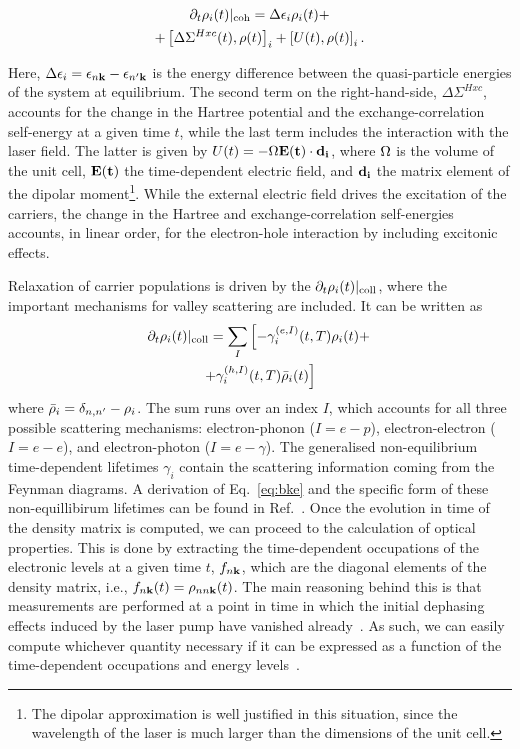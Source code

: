 \documentclass[prb,aps,superscriptaddress,reprint,floatfix]{revtex4-1}
\begin{document}
\begin{multline}
 \partial_t\rho_i(t)|_\text{coh} = \Delta\epsilon_i\rho_i(t) +\\ +\left[\Delta\Sigma^{Hxc}(t),\rho(t)\right]_i + \left[U(t),\rho(t)\right]_i.
\label{eq:coh}   
\end{multline}

Here, $\Delta\epsilon_i = \epsilon_{n{\mathbf k}} - \epsilon_{n' {\mathbf k}}$ is the energy difference between the quasi-particle energies of the system at equilibrium. The second term on the right-hand-side, $\Delta\Sigma^{Hxc}$, accounts for the change in the Hartree potential and the exchange-correlation self-energy at a given time $t$, while the last term includes the interaction with the laser field. The latter is given by $U(t) = -\Omega\bf E(t)\cdot\bf d_i$, where $\Omega$ is the volume of the unit cell, $\bf E(t)$ the time-dependent electric field, and $\bf d_i$ the matrix element of the dipolar moment\footnote{The dipolar approximation is well justified in this situation, since the wavelength of the laser is much larger than the dimensions of the unit cell.}. While the external electric field drives the excitation of the carriers, the change in the Hartree and exchange-correlation self-energies accounts, in linear order, for the electron-hole interaction by including excitonic effects. 

Relaxation of carrier populations is driven by the $\partial_t\rho_i(t)|_\text{coll}$, where the important mechanisms for valley scattering are included. It can be written as
\begin{multline}
    \partial_t\rho_i(t)|_\text{coll} = \sum_I\left[-\gamma_i^{(e,I)}(t,T)\rho_i(t)+\right.\\
\left.+\gamma_i^{(h,I)}(t,T)\bar{\rho}_i(t)\right]
\label{eq:coll}
\end{multline}
where $\bar{\rho}_i = \delta_{n,n'} - \rho_i$. The sum runs over an index $I$, which accounts for all three possible scattering mechanisms: electron-phonon ($I = e-p$), electron-electron ($I=e-e$), and electron-photon ($I=e-\gamma$). The generalised non-equilibrium time-dependent lifetimes $\gamma_i$ contain the scattering information coming from the Feynman diagrams. A derivation of Eq.~\eqref{eq:bke} and the specific form of these non-equillibirum lifetimes can be found in Ref.~. Once the evolution in time of the density matrix is computed, we can proceed to the calculation of optical properties. This is done by extracting the time-dependent occupations of the electronic levels at a given time $t$, $f_{n{\mathbf k}}$, which are the diagonal elements of the density matrix, i.e., $f_{n{\mathbf k}}(t) = \rho_{{nn\bf k}}(t)$. The main reasoning behind this is that measurements are performed at a point in time in which the initial dephasing effects induced by the laser pump have vanished already~\cite{pedro-paper,m.2012,PhysRevB.84.245110,PhysRevB.92.205304}. As such, we can easily compute whichever quantity necessary if it can be expressed as a function of the time-dependent occupations and energy levels~\cite{pedro-paper,m.2012,PhysRevB.84.245110,PhysRevB.92.205304}.
\end{document}
